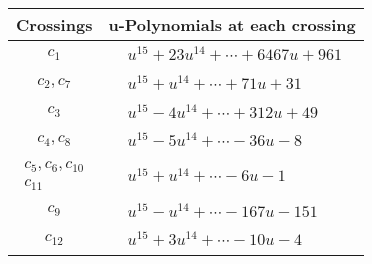 \documentclass[1p]{elsarticle_modified}
\theoremstyle{definition}
\begin{document}
\begin{tabular}{m{50pt}|m{274pt}}
Crossings & \hspace{64pt}u-Polynomials at each crossing \\
\hline $$\begin{aligned}c_{1}\end{aligned}$$&$\begin{aligned}
&u^{15}+23 u^{14}+\cdots+6467 u+961
\end{aligned}$\\
\hline $$\begin{aligned}c_{2},c_{7}\end{aligned}$$&$\begin{aligned}
&u^{15}+u^{14}+\cdots+71 u+31
\end{aligned}$\\
\hline $$\begin{aligned}c_{3}\end{aligned}$$&$\begin{aligned}
&u^{15}-4 u^{14}+\cdots+312 u+49
\end{aligned}$\\
\hline $$\begin{aligned}c_{4},c_{8}\end{aligned}$$&$\begin{aligned}
&u^{15}-5 u^{14}+\cdots-36 u-8
\end{aligned}$\\
\hline $$\begin{aligned}c_{5},c_{6},c_{10}\\c_{11}\end{aligned}$$&$\begin{aligned}
&u^{15}+u^{14}+\cdots-6 u-1
\end{aligned}$\\
\hline $$\begin{aligned}c_{9}\end{aligned}$$&$\begin{aligned}
&u^{15}- u^{14}+\cdots-167 u-151
\end{aligned}$\\
\hline $$\begin{aligned}c_{12}\end{aligned}$$&$\begin{aligned}
&u^{15}+3 u^{14}+\cdots-10 u-4
\end{aligned}$\\
\hline
\end{tabular}\\~\\
\end{document}

